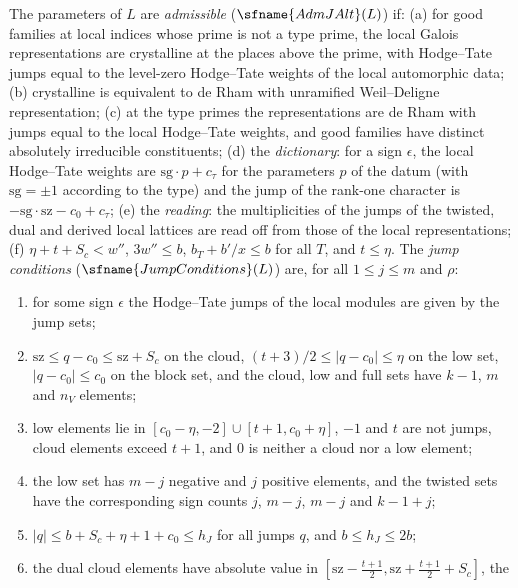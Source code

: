 \begin{definition}\label{pf:sh-theta:jumpdef}
The parameters of $L$ are \emph{admissible} ($\sfname{AdmJAlt}(L)$) if: (a) for good families at local indices whose prime is not a
type prime, the local Galois representations are crystalline at the places above the prime, with Hodge--Tate jumps equal to the
level-zero Hodge--Tate weights of the local automorphic data; (b) crystalline is equivalent to de Rham with unramified
Weil--Deligne representation; (c) at the type primes the representations are de Rham with jumps equal to the local Hodge--Tate
weights, and good families have distinct absolutely irreducible constituents; (d) the \emph{dictionary}: for a sign $\epsilon$,
the local Hodge--Tate weights are $\mathrm{sg}\cdot p+c_\tau$ for the parameters $p$ of the datum (with $\mathrm{sg}=\pm1$ according to the
type) and the jump of the rank-one character is $-\mathrm{sg}\cdot\mathrm{sz}-c_0+c_\tau$; (e) the \emph{reading}: the multiplicities
of the jumps of the twisted, dual and derived local lattices are read off from those of the local representations; (f)
$\eta+t+S_c<w''$, $3w''\le b$, $b_T+b'/x\le b$ for all $T$, and $t\le\eta$. The \emph{jump conditions} ($\sfname{JumpConditions}(L)$)
are, for all $1\le j\le m$ and $\rho$:
\begin{enumerate}[label=(J\arabic*),leftmargin=*]
\item\label{pf:sh-theta:J1} for some sign $\epsilon$ the Hodge--Tate jumps of the local modules are given by the jump sets;
\item\label{pf:sh-theta:J2} $\mathrm{sz}\le q-c_0\le\mathrm{sz}+S_c$ on the cloud, $(t+3)/2\le|q-c_0|\le\eta$ on the low set, $|q-c_0|\le c_0$ on
the block set, and the cloud, low and full sets have $k-1$, $m$ and $n_V$ elements;
\item\label{pf:sh-theta:J3} low elements lie in $[c_0-\eta,-2]\cup[t+1,c_0+\eta]$, $-1$ and $t$ are not jumps, cloud elements exceed
$t+1$, and $0$ is neither a cloud nor a low element;
\item\label{pf:sh-theta:J4} the low set has $m-j$ negative and $j$ positive elements, and the twisted sets have the corresponding
sign counts $j$, $m-j$, $m-j$ and $k-1+j$;
\item\label{pf:sh-theta:J5} $|q|\le b+S_c+\eta+1+c_0\le h_J$ for all jumps $q$, and $b\le h_J\le2b$;
\item\label{pf:sh-theta:J6} the dual cloud elements have absolute value in $[\mathrm{sz}-\frac{t+1}2,\mathrm{sz}+\frac{t+1}2+S_c]$, the

\end{enumerate}
\end{definition}
